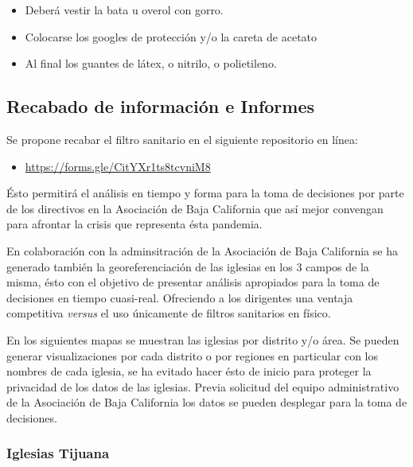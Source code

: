 \documentclass[]{article}
\providecommand{\tightlist}{%
  \setlength{\itemsep}{0pt}\setlength{\parskip}{0pt}}
\begin{document}
\begin{enumerate}
  \begin{itemize}
  \tightlist
  \item
    Deberá vestir la bata u overol con gorro.
  \item
    Colocarse los googles de protección y/o la careta de acetato
  \item
    Al final los guantes de látex, o nitrilo, o polietileno.
  \end{itemize}
\end{enumerate}

\subsection{Recabado de información e
Informes}\label{recabado-de-informaciuxf3n-e-informes}

Se propone recabar el filtro sanitario en el siguiente repositorio en
línea:

\begin{itemize}
\tightlist
\item
  \url{https://forms.gle/CitYXr1ts8tcvniM8}
\end{itemize}

Ésto permitirá el análisis en tiempo y forma para la toma de decisiones
por parte de los directivos en la Asociación de Baja California que así
mejor convengan para afrontar la crisis que representa ésta pandemia.

En colaboración con la adminsitración de la Asociación de Baja
California se ha generado también la georeferenciación de las iglesias
en los 3 campos de la misma, ésto con el objetivo de presentar análisis
apropiados para la toma de decisiones en tiempo cuasi-real. Ofreciendo a
los dirigentes una ventaja competitiva \emph{versus} el uso únicamente
de filtros sanitarios en físico.

En los siguientes mapas se muestran las iglesias por distrito y/o área.
Se pueden generar visualizaciones por cada distrito o por regiones en
particular con los nombres de cada iglesia, se ha evitado hacer ésto de
inicio para proteger la privacidad de los datos de las iglesias. Previa
solicitud del equipo administrativo de la Asociación de Baja California
los datos se pueden desplegar para la toma de decisiones.

\subsubsection{Iglesias Tijuana}\label{iglesias-tijuana}
\end{document}
